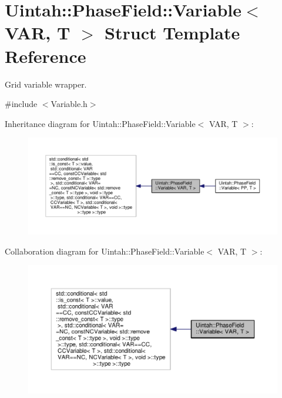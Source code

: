 \hypertarget{structUintah_1_1PhaseField_1_1Variable}{}\section{Uintah\+:\+:Phase\+Field\+:\+:Variable$<$ V\+AR, T $>$ Struct Template Reference}
\label{structUintah_1_1PhaseField_1_1Variable}


Grid variable wrapper.  




{\ttfamily \#include $<$Variable.\+h$>$}



Inheritance diagram for Uintah\+:\+:Phase\+Field\+:\+:Variable$<$ V\+AR, T $>$\+:\nopagebreak
\begin{figure}[H]
\begin{center}
\leavevmode
\includegraphics[width=350pt]{structUintah_1_1PhaseField_1_1Variable__inherit__graph}
\end{center}
\end{figure}


Collaboration diagram for Uintah\+:\+:Phase\+Field\+:\+:Variable$<$ V\+AR, T $>$\+:\nopagebreak
\begin{figure}[H]
\begin{center}
\leavevmode
\includegraphics[width=350pt]{structUintah_1_1PhaseField_1_1Variable__coll__graph}
\end{center}
\end{figure}


